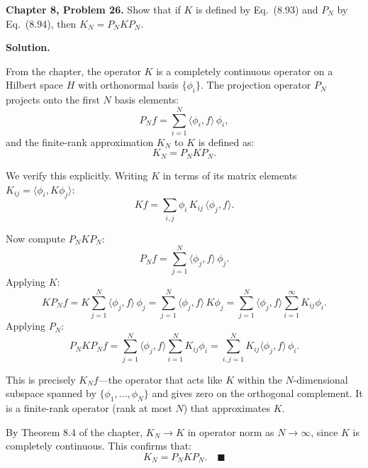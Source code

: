 \documentclass[12pt]{article}
\begin{document}
\textbf{Chapter 8, Problem 26.} Show that if $K$ is defined by Eq.\ (8.93) and $P_N$ by Eq.\ (8.94), then $K_N = P_NKP_N$.

\bigskip
\textbf{Solution.}

From the chapter, the operator $K$ is a completely continuous operator on a Hilbert space $H$ with orthonormal basis $\{\phi_i\}$. The projection operator $P_N$ projects onto the first $N$ basis elements:
\[
P_N f = \sum_{i=1}^{N}\langle\phi_i,f\rangle\,\phi_i,
\]
and the finite-rank approximation $K_N$ to $K$ is defined as:
\[
K_N = P_N K P_N.
\]

We verify this explicitly. Writing $K$ in terms of its matrix elements $K_{ij} = \langle\phi_i, K\phi_j\rangle$:
\[
Kf = \sum_{i,j}\phi_i\,K_{ij}\,\langle\phi_j,f\rangle.
\]

Now compute $P_NKP_N$:
\[
P_Nf = \sum_{j=1}^{N}\langle\phi_j,f\rangle\,\phi_j.
\]
Applying $K$:
\[
KP_Nf = K\sum_{j=1}^{N}\langle\phi_j,f\rangle\,\phi_j = \sum_{j=1}^{N}\langle\phi_j,f\rangle\,K\phi_j = \sum_{j=1}^N\langle\phi_j,f\rangle\sum_{i=1}^\infty K_{ij}\phi_i.
\]
Applying $P_N$:
\[
P_NKP_Nf = \sum_{j=1}^N\langle\phi_j,f\rangle\sum_{i=1}^N K_{ij}\phi_i = \sum_{i,j=1}^{N}K_{ij}\langle\phi_j,f\rangle\,\phi_i.
\]

This is precisely $K_N f$---the operator that acts like $K$ within the $N$-dimensional subspace spanned by $\{\phi_1,\ldots,\phi_N\}$ and gives zero on the orthogonal complement. It is a finite-rank operator (rank at most $N$) that approximates $K$.

By Theorem 8.4 of the chapter, $K_N\to K$ in operator norm as $N\to\infty$, since $K$ is completely continuous. This confirms that:
\[
\boxed{K_N = P_NKP_N.} \quad\blacksquare
\]
\end{document}
